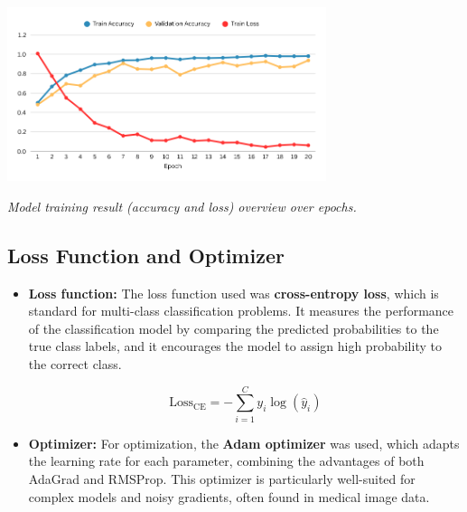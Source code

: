 \vspace{1em}
\begin{center} 
    \includegraphics[width=0.7\textwidth]{../assets/05-training/train-evaluation.png} 

    \small\textit{Model training result (accuracy and loss) overview over epochs.}
\end{center}
\vspace{1em}


\subsection{Loss Function and Optimizer}

\begin{itemize}
    \item \textbf{Loss function:} The loss function used was \textbf{cross-entropy loss}, which is 
    standard for multi-class classification problems. It measures the performance of the 
    classification model by comparing the predicted probabilities to the true class labels, and it 
    encourages the model to assign high probability to the correct class.

    \begin{center}
    \[
    \text{Loss}_{\text{CE}} = - \sum_{i=1}^{C} y_i \log(\hat{y}_i)
    \]
    \end{center}

    \item \textbf{Optimizer:} For optimization, the \textbf{Adam optimizer} was used, which adapts 
    the learning rate for each parameter, combining the advantages of both AdaGrad and RMSProp. 
    This optimizer is particularly well-suited for complex models and noisy gradients, often found 
    in medical image data.
\end{itemize}
